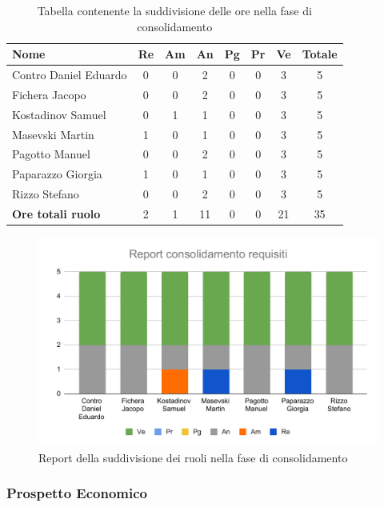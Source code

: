 \documentclass[../piano_di_progetto.tex]{subfiles}
\begin{document}
\begin{table}[!ht]

	\centering
	\begin{tabular}{|l|c|c|c|c|c|c|c|}
	\hline
	\rowcolor{lightgray}
	\textbf{Nome} & \textbf{Re} & \textbf{Am} & \textbf{An} & \textbf{Pg}  & \textbf{Pr}   & \textbf{Ve} & \textbf{Totale} \\
	\hline
		Contro Daniel Eduardo & 0 & 0 & 2 & 0 & 0 & 3  & 5 \\
		Fichera Jacopo & 0 & 0 & 2 & 0 & 0 & 3 & 5 \\
		Kostadinov Samuel & 0 & 1 & 1 & 0 & 0 & 3 & 5 \\			
		Masevski Martin & 1 & 0 & 1 & 0 & 0 & 3 & 5 \\
		Pagotto Manuel & 0 & 0 & 2 & 0 & 0 & 3 & 5 \\			
		Paparazzo Giorgia & 1 & 0 & 1 & 0 & 0 & 3 & 5 \\
		Rizzo Stefano & 0 & 0 & 2 & 0 & 0 & 3 & 5 \\
		\hline
		\textbf{Ore totali ruolo} & 2 & 1 & 11 & 0 & 0 & 21 & 35 \\
	\hline	
	\end{tabular}
	\caption{Tabella contenente la suddivisione delle ore nella fase di consolidamento}
\end{table}

\begin{figure}[H]
\centering
\includegraphics[width=12cm]{src/img/report/report_consolidamento}
\caption{Report della suddivisione dei ruoli nella fase di consolidamento}
\end{figure}

\subsubsection{Prospetto Economico}
\end{document}

